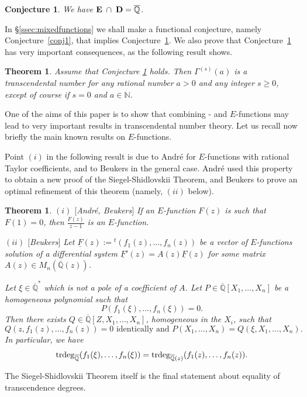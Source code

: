 \documentclass[reqno,12pt]{article}
\numberwithin{equation}{section}
\newtheorem{theo}{Theorem}
\newtheorem{conj}{Conjecture}
\newtheorem{thmx}{Theorem}
\theoremstyle{remark}
\newcommand{\N}{\mathbb{N}}
\newcommand{\Qbar}{\overline{\mathbb Q}}
\newcommand{\etoile}{^*}
\newcommand{\trdeg}{{\rm trdeg}}
\newcommand{\tantie}{\foreignlanguage{russian}{\CYREREV}}
\newcommand{\antie}{\text{\tantie}}
\begin{document}
\begin{conj} \label{conj3} We have ${\bf E} \;\cap\;{ \bf D} =\Qbar$.
\end{conj}

In \S \ref{ssec:mixedfunctions} we shall make a functional conjecture, namely Conjecture~\ref{conj1}, that implies  Conjecture~\ref{conj3}. We also prove that  Conjecture~\ref{conj3} has very important  consequences, as the following result shows. 

\begin{theo}\label{prop3} 
 Assume that Conjecture \ref{conj3} holds. Then $\Gamma^{(s)}(a)$  is a transcendental number for any rational number $a>0$ and any integer $s\geq 0$, except of course if $s=0$ and $a\in\N$.
\end{theo} 



One of the aims of this paper is to show that combining \antie- and $E$-functions may lead to very important results in transcendental number theory. Let us recall now briefly the main known results on $E$-functions.



Point $(i)$ in the following result is due to André  \cite{andre2} for $E$-functions with rational Taylor coefficients, and to Beukers  \cite{beukers} in the general case. 
 Andr\'e used this property to obtain a new proof of the Siegel-Shidlovskii Theorem, and Beukers   to prove an optimal refinement of this theorem (namely, $(ii)$  
 below). 
 

\begin{thmx} \label{theoe} 
$(i)$ $[$André, Beukers$]$ If an $E$-function $F(z)$ is such that $F(1)=0$, then $\frac{F(z)}{z-1}$ is an $E$-function.

$(ii)$ $[$Beukers$]$
Let $\underline{F}(z):={}^t(f_1(z), \ldots, f_n(z))$ be a vector of $E$-functions  solution of a differential system $\underline{F}'(z)=A(z)\underline{F}(z)$ for some matrix $A(z)\in M_n(\Qbar(z))$. 

Let $\xi\in\Qbar\etoile$ which is not a pole of a coefficient of $A$. Let $P\in\Qbar[X_1,\ldots,X_n]$ be a homogeneous polynomial such that 
$$P(f_{1}(\xi), \ldots, f_{n}(\xi))=0.$$
Then there exists $Q\in \Qbar[Z,X_1,\ldots,X_n]$, homogeneous in the $X_i$, such that 
$$Q(z, f_1(z), \ldots, f_n(z))=0 \mbox{ identically  and } P(X_1,\ldots,X_n)=Q(\xi, X_1,\ldots,X_n).$$
In particular, we have
$$
\trdeg_{\Qbar}(f_{1}(\xi), \ldots, f_{n}(\xi)) = 
\trdeg_{\Qbar(z)}( f_{1 }(z), \ldots, f_{n}(z)).
$$
\end{thmx}
The Siegel-Shidlovskii Theorem itself is the final statement about equality of transcendence degrees. 
\end{document}

